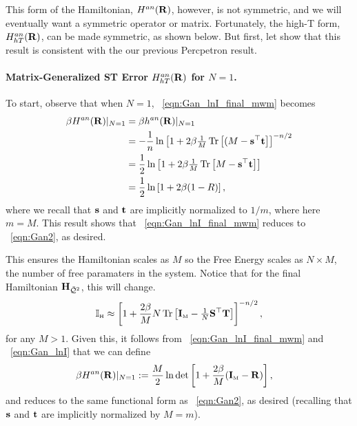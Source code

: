 This form of the Hamiltonian, $H^{an}(\mathbf{R})$, however, is not symmetric, and we will
eventually want a symmetric operator or matrix.
Fortunately, the high-T form, $H^{an}_{hT}(\mathbf{R})$, can be made symmetric, as
shown below.  But first, let show that this result is consistent with the our previous Percpetron result.
  
\paragraph{Matrix-Generalized ST Error $H^{an}_{hT}(\mathbf{R})$ for $N=1$.}
To start, observe that when $N=1$, \EQN~\ref{eqn:Gan_lnI_final_mwm} becomes
\begin{align}
\nonumber
\beta H^{an}(\mathbf{R})\vert_{N=1}
&= \beta h^{an}(\mathbf{R})\vert_{N=1}  \\ 
  &=  -\frac{1}{n}\ln  \left[1  + 2\beta\tfrac{1}{M}\mbox{}\operatorname{Tr}\left[(M-{\mathbf{s}}^{\top}{\mathbf{t}}\right]\right]^{-n/2} \\ 
\nonumber
  &= \frac{1}{2}\ln  \left[1  + 2\beta\tfrac{1}{M}\mbox{}\operatorname{Tr}\left[M-{\mathbf{s}}^{\top}{\mathbf{t}}\right]\right] \\ 
\label{eqn:GANmat_m_equals_1}
  &=  \frac{1}{2}\ln \left[1 + 2\beta(1-R)\right]  ,
\end{align}
where we recall that ${\mathbf{s}}$ and ${\mathbf{t}}$ are implicitly normalized to $1/m$, where here $m=M$.  This result shows that \EQN~\ref{eqn:Gan_lnI_final_mwm} reduces to \EQN~\ref{eqn:Gan2}, as desired.

This ensures the Hamiltonian scales as $M$ so the Free Energy scales as $N \times M$, the
number of free paramaters in the system.
Notice that for the final \LayerQualitySquared Hamiltonian $\mathbf{H}_{\bar{\mathcal{Q}}^{2}}$, this will change.
\begin{align}
  \label{eqn:I_9}
    \mathbb{I}_{\text{\tiny H}}\approx  \left[1  + \frac{2\beta}{M}N\mbox{}\operatorname{Tr}\left[\mathbf{I}_{\text{\tiny M}}-\tfrac{1}{N}{\mathbf{S}}^{\top}{\mathbf{T}}\right]\right]^{-n/2} ,
\end{align}
for any $M>1$.
Given this, it follows from \EQN~\ref{eqn:Gan_lnI_final_mwm} and \EQN~\ref{eqn:Gan_lnI} that we can define 
\begin{align}
\label{eqn:GANmat}
\beta H^{an}(\mathbf{R}) \vert_{N=1}
  &:=  \frac{M}{2}\ln\det \left[1 + \frac{2\beta}{M}(\mathbf{I}_{\text{\tiny M}}-\mathbf{R})\right]  ,
\end{align}
and reduces to the same functional form as \EQN~\ref{eqn:Gan2}, as desired (recalling that ${\mathbf{s}}$ and ${\mathbf{t}}$ are implicitly normalized by $M=m$).

